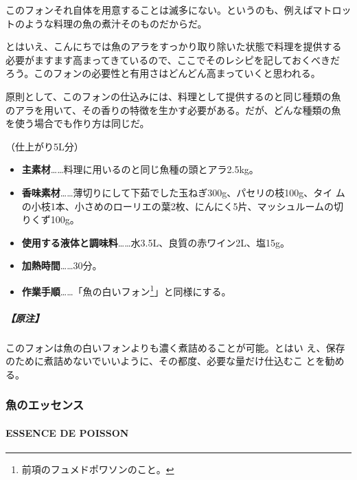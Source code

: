 \begin{recette}
このフォンそれ自体を用意することは滅多にない。というのも、例えばマトロッ
トのような料理の魚の煮汁そのものだからだ。

とはいえ、こんにちでは魚のアラをすっかり取り除いた状態で料理を提供する
必要がますます高まってきているので、ここでそのレシピを記しておくべきだ
ろう。このフォンの必要性と有用さはどんどん高まっていくと思われる。

原則として、このフォンの仕込みには、料理として提供するのと同じ種類の魚
のアラを用いて、その香りの特徴を生かす必要がある。だが、どんな種類の魚
を使う場合でも作り方は同じだ。

（仕上がり5L分）

\begin{itemize}
\item
  \textbf{主素材}\ldots{}\ldots{}料理に用いるのと同じ魚種の頭とアラ2.5kg。
\item
  \textbf{香味素材}\ldots{}\ldots{}薄切りにして下茹でした玉ねぎ300g、パセリの枝100g、タイ
  ムの小枝1本、小さめのローリエの葉2枚、にんにく5片、マッシュルームの切
  りくず100g。
\item
  \textbf{使用する液体と調味料}\ldots{}\ldots{}水3.5L、良質の赤ワイン2L、塩15g。
\item
  \textbf{加熱時間}\ldots{}\ldots{}30分。
\item
  \textbf{作業手順}\ldots{}\ldots{}「魚の白いフォン\footnote{前項のフュメドポワソンのこと。}」と同様にする。
\end{itemize}

\hypertarget{ux539fux6ce8-3}{%
\subparagraph{【原注】}\label{ux539fux6ce8-3}}

このフォンは魚の白いフォンよりも濃く煮詰めることが可能。とはい
え、保存のために煮詰めないでいいように、その都度、必要な量だけ仕込むこ
とを勧める。

\maeaki

\hypertarget{ux9b5aux306eux30a8ux30c3ux30bbux30f3ux30b9}{%
\subsubsection{魚のエッセンス}\label{ux9b5aux306eux30a8ux30c3ux30bbux30f3ux30b9}}

\hypertarget{essence-de-poisson}{%
\paragraph{ESSENCE DE POISSON}\label{essence-de-poisson}}



\end{recette}
